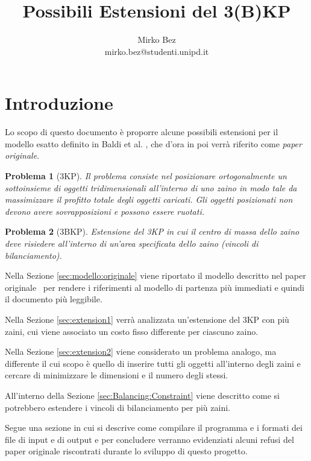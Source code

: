 \documentclass{scrartcl}
\title{Possibili Estensioni del 3(B)KP}
\author{Mirko Bez \\
	mirko.bez@studenti.unipd.it
	}
\newtheorem{problem}{Problema}
\begin{document}
\allowdisplaybreaks


\maketitle
\tableofcontents
\newpage
\section{Introduzione}
Lo scopo di questo documento è proporre alcune possibili estensioni per il modello esatto definito in Baldi et al. \cite{Baldi20129802}, che d'ora in poi verrà riferito come \emph{paper originale}.

\begin{problem}[3KP]
Il problema consiste nel posizionare ortogonalmente un sottoinsieme di oggetti tridimensionali all'interno di uno zaino in modo tale da massimizzare il profitto totale degli oggetti caricati. 
Gli oggetti posizionati non devono avere sovrapposizioni e possono essere ruotati.
\end{problem}

\begin{problem}[3BKP]
	Estensione del 3KP in cui il centro di massa dello zaino deve risiedere all'interno di un'area specificata dello zaino (vincoli di bilanciamento).
\end{problem}

Nella Sezione \ref{sec:modello:originale} viene riportato il modello descritto nel paper originale~\cite{Baldi20129802} per rendere i riferimenti al modello
di partenza più immediati e quindi il documento più leggibile.

Nella Sezione \ref{sec:extension1} verrà analizzata un'estensione del 3KP con più zaini, cui viene associato un costo fisso differente per ciascuno zaino.

Nella Sezione \ref{sec:extension2} viene considerato un problema analogo, ma differente il cui scopo è quello di inserire tutti gli oggetti all'interno degli zaini e cercare di minimizzare le dimensioni e il numero degli stessi. 

 All'interno della Sezione \ref{sec:Balancing:Constraint} viene descritto come si potrebbero estendere i vincoli di bilanciamento per più zaini. 


Segue una sezione in cui si descrive come compilare il programma e i formati dei file di input e di output e per concludere verranno evidenziati alcuni refusi del paper originale riscontrati durante lo sviluppo di questo progetto.
\end{document}
